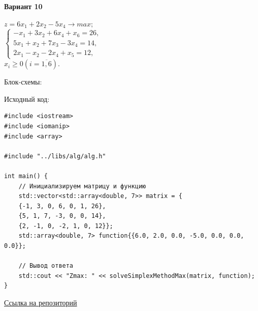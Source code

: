 \documentclass[a4paper,14pt]{extarticle}
\begin{document}
\begin{center}
    \textbf{Вариант 10}
\end{center}
\begin{center}
    $z = 6 x_1 + 2x_2 -5x_4 \rightarrow max;$\\
    $\begin{cases}
        -x_1 + 3x_2 + 6x_4 + x_6 = 26, \\
        5x_1 + x_2 + 7x_3 -3x_4 = 14,  \\
        2x_1 - x_2 - 2x_4 + x_5 = 12,
    \end{cases}$\\
    $x_i \ge 0 (i = \overline{1, 6})$.
\end{center}

Блок-схемы:
\begin{center}
    \bigbreak
    \bigbreak
    \bigbreak
    
\end{center}

Исходный код:
\begin{verbatim}
#include <iostream>
#include <iomanip>
#include <array>

#include "../libs/alg/alg.h"

int main() {
    // Инициализируем матрицу и функцию
    std::vector<std::array<double, 7>> matrix = {
    {-1, 3, 0, 6, 0, 1, 26},
    {5, 1, 7, -3, 0, 0, 14},
    {2, -1, 0, -2, 1, 0, 12}};
    std::array<double, 7> function{{6.0, 2.0, 0.0, -5.0, 0.0, 0.0, 0.0}};

    // Вывод ответа
    std::cout << "Zmax: " << solveSimplexMethodMax(matrix, function);
}
    \end{verbatim}
\href{https://github.com/IAmProgrammist/operations_research/blob/master/src/lab2/main.cpp}{Ссылка на репозиторий}\\
\end{document}
